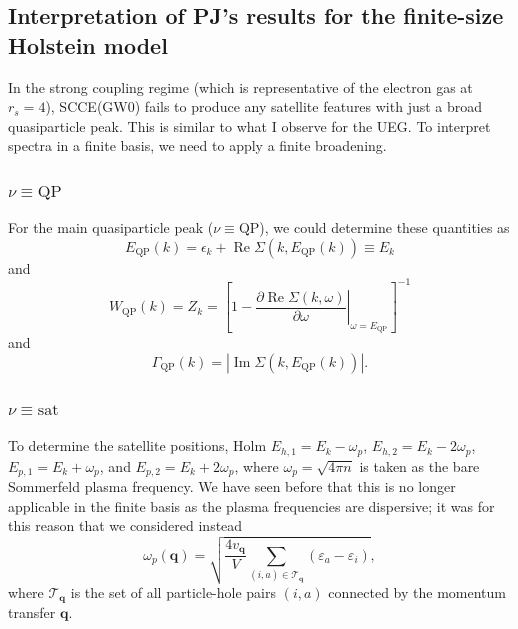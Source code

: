 \subsection{Interpretation of PJ's results for the finite-size Holstein model}
In the strong coupling regime (which is representative of the electron gas at $r_s=4$), SCCE(GW0) fails to produce any satellite features with just a broad quasiparticle peak. This is similar to what I observe for the UEG.
To interpret spectra in a finite basis, we need to apply a finite broadening. 
\subsubsection{\(\nu \equiv \mathrm{QP}\)}
For the main quasiparticle peak ($\nu\equiv \mathrm{QP}$), we could determine these quantities as
\begin{equation}
E_{\mathrm{QP}}(k)=\epsilon_k+\operatorname{Re} \Sigma\left(k, E_{\mathrm{QP}}(k)\right) \equiv E_k
\end{equation}
and
\begin{equation}
W_{\mathrm{QP}}(k)=Z_k=\left[1-\left.\frac{\partial \operatorname{Re} \Sigma(k, \omega)}{\partial \omega}\right|_{\omega=E_{\mathrm{QP}}}\right]^{-1}     
\end{equation}
and 
\begin{equation}
\Gamma_{\mathrm{QP}}(k)=\left|\operatorname{Im} \Sigma\left(k, E_{\mathrm{QP}}(k)\right)\right| .
\end{equation}
\subsubsection{\(\nu \equiv\mathrm{sat}\)}
To determine the satellite positions, Holm  $E_{h, 1}=E_k-\omega_p$, $E_{h, 2}=E_k-2 \omega_p$, $E_{p, 1}=E_k+\omega_p$, and $E_{p, 2}=E_k+2 \omega_p$, where $\omega_p = \sqrt{4 \pi n}$ is taken as the bare Sommerfeld plasma frequency. We have seen before that this is no longer applicable in the finite basis as the plasma frequencies are dispersive; it was for this reason that we considered instead
\begin{equation}
    \omega_p(\mathbf{q})
    =
   \sqrt{\frac{4v_{\mathbf{q}}}{V}
    \sum_{(i,a)\in\mathcal{T}_{\mathbf{q}}}
    \left(\varepsilon_a-\varepsilon_i\right)},
\end{equation}
where $\mathcal{T}_{\mathbf{q}}$ is the set of all particle-hole pairs $(i,a)$ connected by the momentum transfer $\mathbf{q}$.
